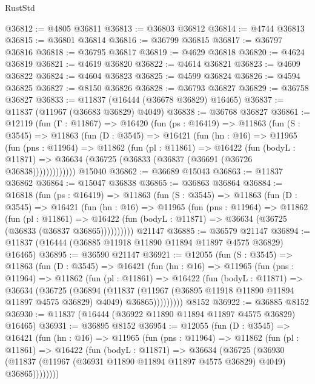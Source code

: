 \begin{lexlean}{RustStd}
\begin{coremodule}
@36812 := @4805 @36811
@36813 := @36803 @36812
@36814 := @4744 @36813
@36815 := @36801 @36814
@36816 := @36799 @36815
@36817 := @36797 @36816
@36818 := @36795 @36817
@36819 := @4629 @36818
@36820 := @4624 @36819
@36821 := @4619 @36820
@36822 := @4614 @36821
@36823 := @4609 @36822
@36824 := @4604 @36823
@36825 := @4599 @36824
@36826 := @4594 @36825
@36827 := @8150 @36826
@36828 := @36793 @36827
@36829 := @36758 @36827
@36833 := @11837 (@16444 (@36678 @36829) @16465)
@36837 := @11837 (@11967 (@36683 @36829) @4049)
@36838 := @36768 @36827
@36861 := @12119
    (fun (Γ : @11867) =>
    @16420
      (fun (ps : @16419) =>
      @11863
        (fun (S : @3545) =>
        @11863
          (fun (D : @3545) =>
          @16421
            (fun (hn : @16) =>
            @11965
              (fun (pns : @11964) =>
              @11862
                (fun (pl : @11861) =>
                @16422
                  (fun (bodyL : @11871) =>
                  @36634 (@36725 (@36833 (@36837 (@36691 (@36726 @36838)))))))))))))
    @15040
@36862 := @36689 @15043
@36863 := @11837 @36862
@36864 := @15047 @36838
@36865 := @36863 @36864
@36884 := @16818
    (fun (ps : @16419) =>
    @11863
      (fun (S : @3545) =>
      @11863
        (fun (D : @3545) =>
        @16421
          (fun (hn : @16) =>
          @11965
            (fun (pns : @11964) =>
            @11862
              (fun (pl : @11861) =>
              @16422 (fun (bodyL : @11871) => @36634 (@36725 (@36833 (@36837 @36865))))))))))
    @21147
@36885 := @36579 @21147
@36894 := @11837 (@16444 (@36885 @11918 @11890 @11894 @11897 @4575 @36829) @16465)
@36895 := @36590 @21147
@36921 := @12055
    (fun (S : @3545) =>
    @11863
      (fun (D : @3545) =>
      @16421
        (fun (hn : @16) =>
        @11965
          (fun (pns : @11964) =>
          @11862
            (fun (pl : @11861) =>
            @16422
              (fun (bodyL : @11871) =>
              @36634
                (@36725
                  (@36894
                    (@11837
                      (@11967 (@36895 @11918 @11890 @11894 @11897 @4575 @36829) @4049)
                      @36865)))))))))
    @8152
@36922 := @36885 @8152
@36930 := @11837 (@16444 (@36922 @11890 @11894 @11897 @4575 @36829) @16465)
@36931 := @36895 @8152
@36954 := @12055
    (fun (D : @3545) =>
    @16421
      (fun (hn : @16) =>
      @11965
        (fun (pns : @11964) =>
        @11862
          (fun (pl : @11861) =>
          @16422
            (fun (bodyL : @11871) =>
            @36634
              (@36725
                (@36930
                  (@11837 (@11967 (@36931 @11890 @11894 @11897 @4575 @36829) @4049) @36865))))))))

\end{coremodule}
\end{lexlean}

